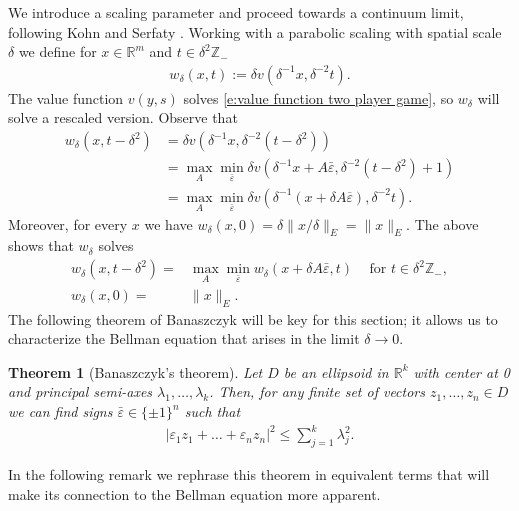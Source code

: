 \documentclass[reqno]{amsart}
\newtheorem{theorem}{Theorem}[section]
\numberwithin{equation}{section}
\newcommand{\R}{\mathbb R}
\newcommand{\eps}{\varepsilon}
\begin{document}
We introduce a scaling parameter and proceed towards a continuum limit, following Kohn and Serfaty \cite{KohnSerfaty2006}. Working with a parabolic scaling with spatial scale $\delta$ we define for $x \in \mathbb{R}^m$ and $t \in \delta^2\mathbb{Z}_-$ 
\begin{align*}
  w_\delta(x,t) := \delta v(\delta^{-1}x,\delta^{-2}t).
\end{align*}
The value function $v(y,s)$ solves \eqref{e:value function two player game}, so $w_\delta$ will solve a rescaled version. Observe that 
\begin{align*}
  w_\delta(x,t-\delta^2) & = \delta v(\delta^{-1}x,\delta^{-2}(t-\delta^2))\\
  & = \max \limits_A \min \limits_{\bar \varepsilon} \delta v(\delta^{-1}x+A\bar\varepsilon,\delta^{-2}(t-\delta^2)+1) \\
  & = \max \limits_A \min \limits_{\bar \varepsilon} \delta v(\delta^{-1}(x+\delta A\overline \varepsilon),\delta^{-2}t).  
\end{align*}
Moreover, for every $x$ we have $w_\delta(x,0) = \delta \|x/\delta\|_E = \|x\|_E$. The above shows that $w_\delta$ solves
\begin{align}
  w_\delta(x,t-\delta^2) = & \max \limits_A \min \limits_{\bar \varepsilon} w_\delta(x+\delta A\bar \varepsilon,t)\;\;\;\text{ for } t \in \delta^2\mathbb{Z}_-, \label{e:rescaled Bellman equation}\\
  w_\delta(x,0) = & \|x\|_E. \label{e:rescaled terminal value}
\end{align}
The following theorem of Banaszczyk \cite[Theorem 1]{Banaszczyk1990} will be key for this section; it allows us to characterize the Bellman equation that arises in the limit $\delta \to 0$.

\begin{theorem}[Banaszczyk's theorem] \label{t:Banaszczyk s theorem} Let $D$ be an ellipsoid in $\R^k$ with center at 0 and principal semi-axes $\lambda_1, \dots, \lambda_k$. Then, for any finite set of vectors $z_1, \dots, z_n \in D$ we can find signs $\bar \eps \in \{\pm 1\}^n$ such that
\begin{align*}
 | \varepsilon_1z_1+\ldots+\varepsilon_n z_n |^2 \leq  \sum_{j=1}^k \lambda_j^2.
\end{align*}
\end{theorem}

In the following remark we rephrase  this theorem in equivalent terms that will make its connection to the Bellman equation more apparent.
\end{document}
